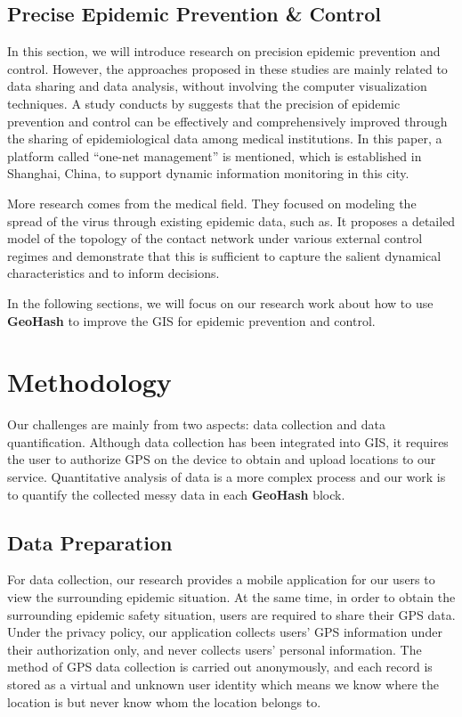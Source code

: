 \documentclass[conference]{IEEEtran}
\begin{document}
\subsection{Precise Epidemic Prevention \& Control}
In this section, we will introduce research on precision epidemic prevention and control.
However, the approaches proposed in these studies are mainly related to data sharing and data analysis, without involving the computer visualization techniques.
A study conducts by\cite{cai2020demand} suggests that the precision of epidemic prevention and control can be effectively and comprehensively improved through the sharing of epidemiological data among medical institutions.
In this paper, a platform called ``one-net management'' is mentioned, which is established in Shanghai, China, to support dynamic information monitoring in this city.

More research comes from the medical field.
They focused on modeling the spread of the virus through existing epidemic data, such as\cite{small2020modelling}.
It proposes a detailed model of the topology of the contact network under various external control regimes and demonstrate that this is sufficient to capture the salient dynamical characteristics and to inform decisions.

In the following sections, we will focus on our research work about how to use \textbf{GeoHash} to improve the GIS for epidemic prevention and control.

\section{Methodology}
Our challenges are mainly from two aspects: data collection and data quantification.
Although data collection has been integrated into GIS, it requires the user to authorize GPS on the device to obtain and upload locations to our service.
Quantitative analysis of data is a more complex process and our work is to quantify the collected messy data in each \textbf{GeoHash} block.
\subsection{Data Preparation}
For data collection, our research provides a mobile application for our users to view the surrounding epidemic situation.
At the same time, in order to obtain the surrounding epidemic safety situation, users are required to share their GPS data.
Under the privacy policy, our application collects users' GPS information under their authorization only, and never collects users' personal information.
The method of GPS data collection is carried out anonymously, and each record is stored as a virtual and unknown user identity which means we know where the location is but never know whom the location belongs to.
\end{document}

